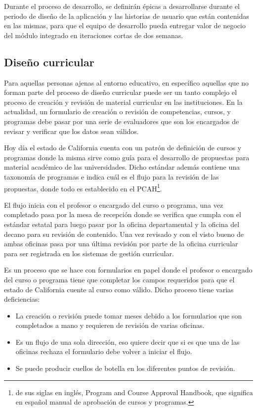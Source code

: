 Durante el proceso de desarrollo, se definirán épicas a desarrollarse durante el periodo de diseño de la aplicación y las historias de usuario que están contenidas en las mismas, para que el equipo de desarrollo pueda entregar valor de negocio del módulo integrado en iteraciones cortas de dos semanas.

\subsection{Diseño curricular}
Para aquellas personas ajenas al entorno educativo, en específico aquellas que no forman parte del proceso de diseño curricular puede ser un tanto complejo el proceso de creación y revisión de material curricular en las instituciones. En la actualidad, un formulario de creación o revisión de competencias, cursos, y programas debe pasar por una serie de evaluadores que son los encargados de revisar y verificar que los datos sean válidos.

Hoy día el estado de California cuenta con un patrón de definición de cursos y programas donde la misma sirve como guía para el desarrollo de propuestas para material académico de las universidades. Dicho estándar además contiene una taxonomía de programas e indica cuál es el flujo para la revisión de las propuestas, donde todo es establecido en el PCAH\footnote{de sus siglas en inglés, Program and Course Approval Handbook, que significa en español manual de aprobación de cursos y programas.}\citep{brice_w_harris_program_2013}.

El flujo inicia con el profesor o encargado del curso o programa, una vez completado pasa por la mesa de recepción donde se verifica que cumpla con el estándar estatal para luego pasar por la oficina departamental y la oficina del decano para su revisión de contenido. Una vez revisado y con el visto bueno de ambas oficinas pasa por una última revisión por parte de la oficina curricular para ser registrada en los sistemas de gestión curricular.

Es un proceso que se hace con formularios en papel donde el profesor o encargado del curso o programa tiene que completar los campos requeridos para que el estado de California cuente al curso como válido. Dicho proceso tiene varias deficiencias:
\begin{itemize}
	\item La creación o revisión puede tomar meses debido a los formularios que son completados a mano y requieren de revisión de varias oficinas.
	\item Es un flujo de una sola dirección, eso quiere decir que si es que una de las oficinas rechaza el formulario debe volver a iniciar el flujo.
	\item Se puede producir cuellos de botella en los diferentes puntos de revisión.
\end{itemize}

